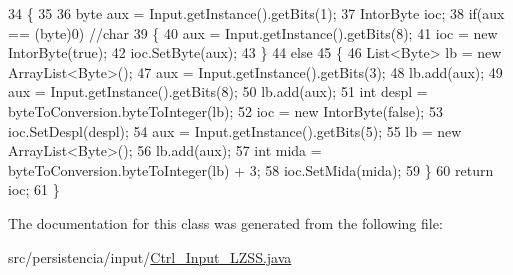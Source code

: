 \begin{DoxyCode}
34     \{
35 
36         byte aux = Input.getInstance().getBits(1);
37         IntorByte ioc;
38         \textcolor{keywordflow}{if}(aux == (byte)0) \textcolor{comment}{//char}
39         \{
40             aux = Input.getInstance().getBits(8);
41             ioc = \textcolor{keyword}{new} IntorByte(\textcolor{keyword}{true});
42             ioc.SetByte(aux);
43         \}
44         \textcolor{keywordflow}{else}
45         \{
46             List<Byte> lb = \textcolor{keyword}{new} ArrayList<Byte>();
47             aux = Input.getInstance().getBits(3);
48             lb.add(aux);
49             aux = Input.getInstance().getBits(8);
50             lb.add(aux);
51             \textcolor{keywordtype}{int} despl = byteToConversion.byteToInteger(lb);
52             ioc = \textcolor{keyword}{new} IntorByte(\textcolor{keyword}{false});
53             ioc.SetDespl(despl);
54             aux = Input.getInstance().getBits(5);
55             lb = \textcolor{keyword}{new} ArrayList<Byte>();
56             lb.add(aux);
57             \textcolor{keywordtype}{int} mida = byteToConversion.byteToInteger(lb) + 3;
58             ioc.SetMida(mida);
59         \}
60         \textcolor{keywordflow}{return} ioc;
61     \}
\end{DoxyCode}


The documentation for this class was generated from the following file\+:\begin{DoxyCompactItemize}
\item 
src/persistencia/input/\hyperlink{Ctrl__Input__LZSS_8java}{Ctrl\+\_\+\+Input\+\_\+\+L\+Z\+S\+S.\+java}\end{DoxyCompactItemize}
